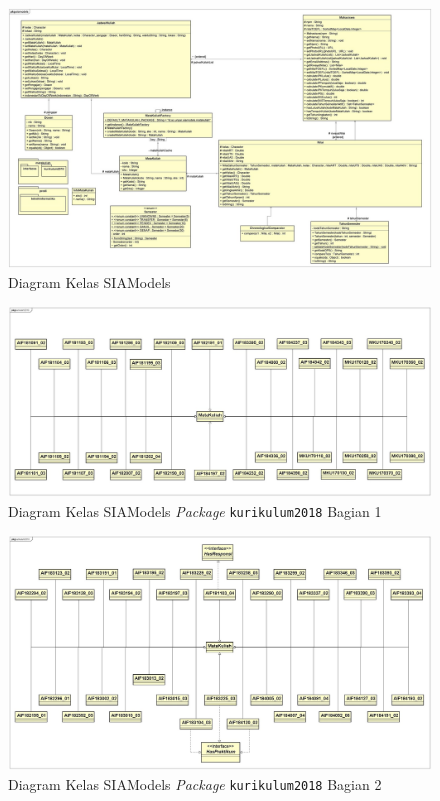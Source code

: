 \begin{figure}[H]
\centering
\includegraphics[scale=0.35]{Gambar/class-diagram-siamodels-new}
\caption{Diagram Kelas SIAModels}
\label{fig:siamodels_class_2018}
\end{figure}

\begin{figure}[H]
\centering
\includegraphics[scale=0.35]{Gambar/class-diagram-siamodels-mk-kurikulum-2018-2}
\caption{Diagram Kelas SIAModels \textit{Package} \texttt{kurikulum2018} Bagian 1}
\label{fig:siamodels_class_2018_kurikulum_1}
\end{figure}

\begin{figure}[H]
\centering
\includegraphics[scale=0.35]{Gambar/class-diagram-siamodels-mk-kurikulum-2018-1}
\caption{Diagram Kelas SIAModels \textit{Package} \texttt{kurikulum2018} Bagian 2}
\label{fig:siamodels_class_2018_kurikulum_2}
\end{figure}